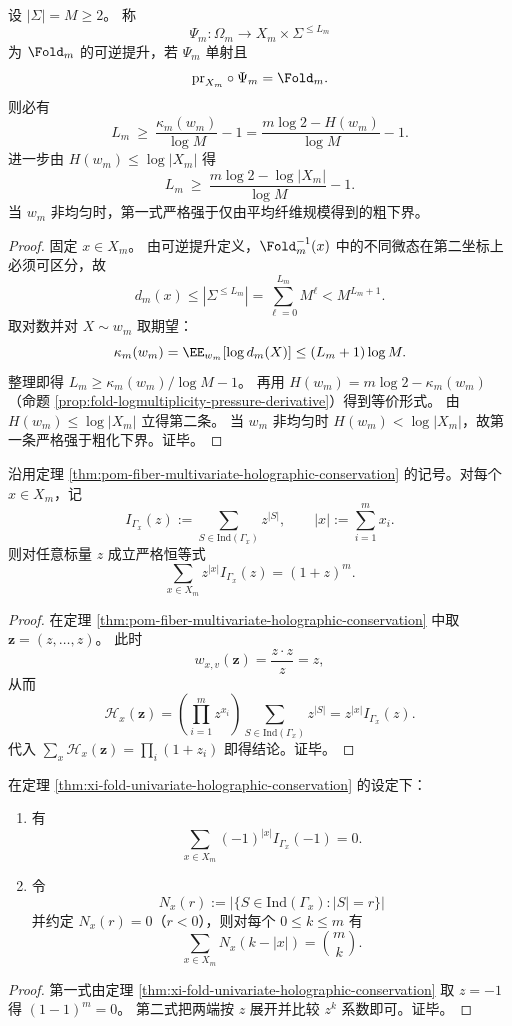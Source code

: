 \begin{theorem}[熵驱动的可逆提升长度下界]\label{thm:xi-fold-reversible-lift-length-lowerbound-kappa}
设 \(|\Sigma|=M\ge 2\)。
称
\[
\Psi_m:\Omega_m\to X_m\times\Sigma^{\le L_m}
\]
为 \(\Fold_m\) 的可逆提升，若 \(\Psi_m\) 单射且
\[
\mathrm{pr}_{X_m}\circ\Psi_m=\Fold_m.
\]
则必有
\[
L_m\ \ge\ \frac{\kappa_m(w_m)}{\log M}-1
=\frac{m\log 2-H(w_m)}{\log M}-1.
\]
进一步由 \(H(w_m)\le \log|X_m|\) 得
\[
L_m\ \ge\ \frac{m\log 2-\log|X_m|}{\log M}-1.
\]
当 \(w_m\) 非均匀时，第一式严格强于仅由平均纤维规模得到的粗下界。
\end{theorem}
\begin{proof}
固定 \(x\in X_m\)。
由可逆提升定义，\(\Fold_m^{-1}(x)\) 中的不同微态在第二坐标上必须可区分，故
\[
d_m(x)\le |\Sigma^{\le L_m}|=\sum_{\ell=0}^{L_m}M^\ell< M^{L_m+1}.
\]
取对数并对 \(X\sim w_m\) 取期望：
\[
\kappa_m(w_m)=\EE_{w_m}[\log d_m(X)]\le (L_m+1)\log M.
\]
整理即得
\(
L_m\ge \kappa_m(w_m)/\log M-1
\)。
再用 \(H(w_m)=m\log 2-\kappa_m(w_m)\)（命题 \ref{prop:fold-logmultiplicity-pressure-derivative}）得到等价形式。
由 \(H(w_m)\le \log|X_m|\) 立得第二条。
当 \(w_m\) 非均匀时 \(H(w_m)<\log|X_m|\)，故第一条严格强于粗化下界。证毕。
\end{proof}

\begin{theorem}[一变量全息守恒的纤维独立集分解]\label{thm:xi-fold-univariate-holographic-conservation}
沿用定理 \ref{thm:pom-fiber-multivariate-holographic-conservation} 的记号。对每个 \(x\in X_m\)，记
\[
I_{\Gamma_x}(z):=\sum_{S\in\mathrm{Ind}(\Gamma_x)} z^{|S|},
\qquad
|x|:=\sum_{i=1}^m x_i.
\]
则对任意标量 \(z\) 成立严格恒等式
\[
\sum_{x\in X_m} z^{|x|}I_{\Gamma_x}(z)=(1+z)^m.
\]
\end{theorem}
\begin{proof}
在定理 \ref{thm:pom-fiber-multivariate-holographic-conservation} 中取
\(
\boldsymbol z=(z,\dots,z)
\)。
此时
\[
w_{x,v}(\boldsymbol z)=\frac{z\cdot z}{z}=z,
\]
从而
\[
\mathcal H_x(\boldsymbol z)
=\left(\prod_{i=1}^m z^{x_i}\right)\sum_{S\in\mathrm{Ind}(\Gamma_x)}z^{|S|}
=z^{|x|}I_{\Gamma_x}(z).
\]
代入
\(
\sum_x \mathcal H_x(\boldsymbol z)=\prod_i(1+z_i)
\)
即得结论。证毕。
\end{proof}

\begin{corollary}[在 \texorpdfstring{$z=-1$}{z=-1} 处的消去与二项卷积约束]\label{cor:xi-fold-zminusone-cancellation-binomial-convolution}
在定理 \ref{thm:xi-fold-univariate-holographic-conservation} 的设定下：
\begin{enumerate}
  \item 有
  \[
  \sum_{x\in X_m}(-1)^{|x|}I_{\Gamma_x}(-1)=0.
  \]
  \item 令
  \[
  N_x(r):=\bigl|\{S\in\mathrm{Ind}(\Gamma_x): |S|=r\}\bigr|
  \]
  并约定 \(N_x(r)=0\)（\(r<0\)），则对每个 \(0\le k\le m\) 有
  \[
  \sum_{x\in X_m}N_x(k-|x|)=\binom{m}{k}.
  \]
\end{enumerate}
\end{corollary}
\begin{proof}
第一式由定理 \ref{thm:xi-fold-univariate-holographic-conservation} 取 \(z=-1\) 得
\(
(1-1)^m=0
\)。
第二式把两端按 \(z\) 展开并比较 \(z^k\) 系数即可。证毕。
\end{proof}

